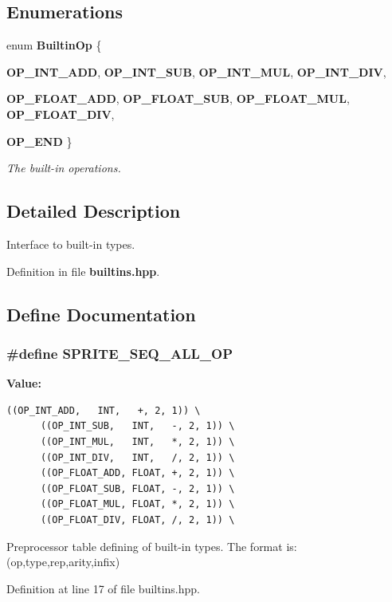 \subsection*{Enumerations}
\begin{CompactItemize}
\item 
enum {\bf Builtin\-Op} \{ \par
{\bf OP\_\-INT\_\-ADD}, 
{\bf OP\_\-INT\_\-SUB}, 
{\bf OP\_\-INT\_\-MUL}, 
{\bf OP\_\-INT\_\-DIV}, 
\par
{\bf OP\_\-FLOAT\_\-ADD}, 
{\bf OP\_\-FLOAT\_\-SUB}, 
{\bf OP\_\-FLOAT\_\-MUL}, 
{\bf OP\_\-FLOAT\_\-DIV}, 
\par
{\bf OP\_\-END}
 \}
\begin{CompactList}\small\item\em The built-in operations. \item\end{CompactList}\end{CompactItemize}


\subsection{Detailed Description}
Interface to built-in types. 



Definition in file {\bf builtins.hpp}.

\subsection{Define Documentation}
\subsubsection{\setlength{\rightskip}{0pt plus 5cm}\#define SPRITE\_\-SEQ\_\-ALL\_\-OP}\label{builtins_8hpp_a0}


{\bf Value:}

\footnotesize\begin{verbatim}((OP_INT_ADD,   INT,   +, 2, 1)) \
      ((OP_INT_SUB,   INT,   -, 2, 1)) \
      ((OP_INT_MUL,   INT,   *, 2, 1)) \
      ((OP_INT_DIV,   INT,   /, 2, 1)) \
      ((OP_FLOAT_ADD, FLOAT, +, 2, 1)) \
      ((OP_FLOAT_SUB, FLOAT, -, 2, 1)) \
      ((OP_FLOAT_MUL, FLOAT, *, 2, 1)) \
      ((OP_FLOAT_DIV, FLOAT, /, 2, 1)) \
\end{verbatim}\normalsize 
Preprocessor table defining of built-in types. The format is: (op,type,rep,arity,infix) 

Definition at line 17 of file builtins.hpp.